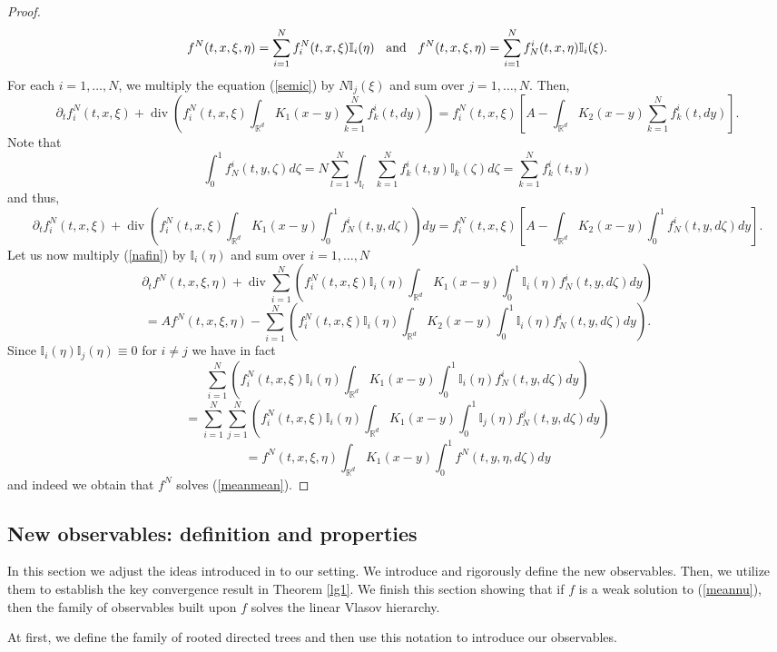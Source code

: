\documentclass[10pt]{article}
\def\divv{\operatorname {div}}
\newcommand{\eqq}[2]{\begin{equation}  #1  \label{#2}\end{equation}    }
\newcommand{\hd}{\hspace{0.2cm}}
\newcommand{\m}[1]{\mbox{#1}}
\newcommand{\izj}{\int_{0}^{1}}
\newcommand{\ird}{\int_{\mathbb{R}^d}}
\newcommand{\fik}{f^i_k}
\newcommand{\mI}{\mathbb{I}}
\begin{document}
\begin{proof}
\[
f^N(t,x,\xi,\eta) = \sum_{i=1}^N f^N_i(t,x,\xi) \mI_{i}(\eta) \hd \m{ and } \hd 
f^N(t,x,\xi,\eta) =\sum_{i=1}^N f_N^i(t,x,\eta) \mI_{i}(\xi).
\]
For each $i=1,\dots, N$, we multiply the equation (\ref{semic}) by $N \mI_j(\xi)$ and sum over $j=1,\dots, N$. Then, 
\[
\partial_t f_i^N(t,x,\xi) + \divv\left(f_i^N(t,x,\xi)\ird K_{1}(x-y)\sum_{k=1}^N\fik(t,dy)\right) = f_i^N(t,x,\xi)\left[A - \ird K_{2}(x-y)\sum_{k=1}^N\fik(t,dy)\right].
\]
Note that
\[
\izj f^i_N(t,y,\zeta)d\zeta = N \sum_{l=1}^N\int_{\mI_l}\sum_{k=1}^N \fik(t,y) \mI_k(\zeta)d\zeta = \sum_{k=1}^N \fik(t,y)
\]
and thus,
\eqq{
\partial_t f_i^N(t,x,\xi) + \divv\left(f_i^N(t,x,\xi)\ird K_{1}(x-y)\izj f^i_N(t,y,d \zeta)\right)dy = f_i^N(t,x,\xi)\left[A - \ird K_{2}(x-y)\izj f^i_N(t,y,d \zeta)dy\right].
}{nafin}
Let us now multiply (\ref{nafin}) by $\mI_i(\eta)$ and sum over $i=1,\dots, N$
\[
\partial_t f^N(t,x,\xi,\eta) + \divv\sum_{i=1}^N \left(f_i^N(t,x,\xi)\mI_i(\eta)\ird K_{1}(x-y)\izj \mI_i(\eta) f^i_N(t,y,d \zeta)dy\right)
\]
\[
=Af^N(t,x,\xi,\eta) - \sum_{i=1}^N \left( f_i^N(t,x,\xi)\mI_i(\eta)\ird K_{2}(x-y)\izj \mI_i(\eta)f^i_N(t,y,d \zeta)dy\right).
\]
Since $\mI_i(\eta) \mI_j(\eta) \equiv 0$ for $i\neq j$ we have in fact 
\[
\sum_{i=1}^N \left(f_i^N(t,x,\xi)\mI_i(\eta)\ird K_{1}(x-y)\izj \mI_i(\eta) f^i_N(t,y,d \zeta)dy\right)
\]
\[
= \sum_{i=1}^N\sum_{j=1}^N \left(f_i^N(t,x,\xi)\mI_i(\eta)\ird K_{1}(x-y)\izj \mI_j(\eta) f^j_N(t,y,d \zeta)dy\right)
\]
\[
=f^N(t,x,\xi,\eta)
\ird K_{1}(x-y)\izj f^N(t,y,\eta,d \zeta)dy
\]
and indeed we obtain that $f^N$ solves (\ref{meanmean}).

\end{proof}

\subsection{New observables: definition and properties}

In this section we adjust the ideas introduced in \cite{JPS2025} to our setting. We introduce and rigorously define the new observables. Then, we utilize them to establish the key convergence result in Theorem \ref{lg1}. We finish this section showing that if $f$ is a weak solution to (\ref{meannu}), then the family of observables built upon $f$ solves the linear Vlasov hierarchy. 


At first, we define the family of rooted directed trees and then use this notation to introduce our observables.
\end{document}
